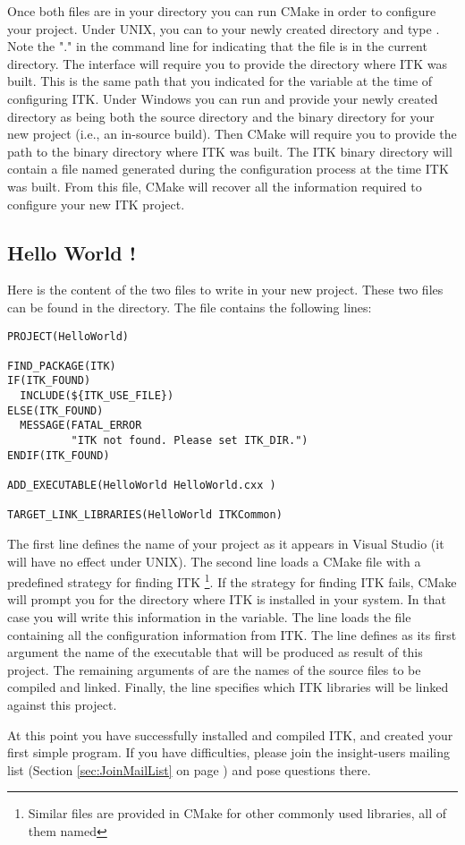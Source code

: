 Once both files are in your directory you can run CMake in order to configure
your project. Under UNIX, you can  to your newly created directory
and type . Note the "." in the command line for indicating
that the  file is in the current directory. The
 interface will require you to provide the directory where ITK
was built. This is the same path that you indicated for the
 variable at the time of configuring ITK. Under
Windows you can run  and provide your newly created
directory as being both the source directory and the binary directory for
your new project (i.e., an in-source build). Then CMake will require you to
provide the path to the binary directory where ITK was built. The ITK binary
directory will contain a file named  generated during the
configuration process at the time ITK was built.  From this file, CMake will
recover all the information required to configure your new ITK project.

\subsection{Hello World !}
\label{sec:HelloWorldITK}


Here is the content of the two files to write in your new project. These two
files can be found in the  directory. The
 file contains the following lines:

\small
\begin{verbatim}
PROJECT(HelloWorld)

FIND_PACKAGE(ITK)
IF(ITK_FOUND)
  INCLUDE(${ITK_USE_FILE})
ELSE(ITK_FOUND)
  MESSAGE(FATAL_ERROR
          "ITK not found. Please set ITK_DIR.")
ENDIF(ITK_FOUND)

ADD_EXECUTABLE(HelloWorld HelloWorld.cxx )

TARGET_LINK_LIBRARIES(HelloWorld ITKCommon)
\end{verbatim}
\normalsize

The first line defines the name of your project as it appears in Visual
Studio (it will have no effect under UNIX). The second line loads a CMake
file with a predefined strategy for finding ITK \footnote{Similar files are
provided in CMake for other commonly used libraries, all of them named
}. If the strategy for finding ITK fails, CMake will prompt
you for the directory where ITK is installed in your system. In that case you
will write this information in the  variable. The line  loads the  file containing
all the configuration information from ITK. The line 
defines as its first argument the name of the executable that will be produced
as result of this project. The remaining arguments of 
are the names of the source files to be compiled and linked.  Finally, the
 line specifies which ITK libraries will be
linked against this project.




At this point you have successfully installed and compiled ITK, and created
your first simple program. If you have difficulties, please join the
insight-users mailing list (Section \ref{sec:JoinMailList} on page
\pageref{sec:JoinMailList}) and pose questions there.
